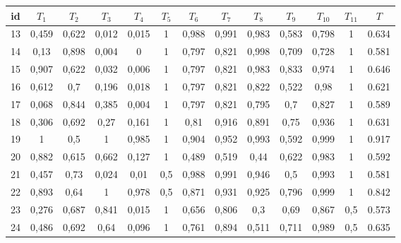 \documentclass{classrep}
\begin{document}
\begin{center}
  \begin{table}[H]
  \begin{adjustbox}{center=11cm}
    \begin{tabularx}{\textwidth}{ccccccccccccc}
    id & $T_1$ & $T_2$ & $T_3$ & $T_4$ & $T_5$ & $T_6$ & $T_7$ & $T_8$ & $T_9$ & $T_{10}$ & $T_{11}$ & $T$ \\ \hline 
   13 & 0,459 &  0,622 & 0,012 & 0,015 & 1 & 0,988 & 0,991 & 0,983 & 0,583 & 0,798 & 1 & 0.634 \\ \hline
   14 & 0,13 & 0,898 & 0,004 & 0 & 1 & 0,797 & 0,821 & 0,998 & 0,709 & 0,728 & 1 & 0.581 \\ \hline
   15 & 0,907& 0,622 & 0,032 & 0,006 & 1 & 0,797 & 0,821 & 0,983 & 0,833 & 0,974 & 1 & 0.646 \\ \hline
   16 & 0,612 & 0,7 & 0,196 & 0,018 & 1 & 0,797 & 0,821 & 0,822 & 0,522 & 0,98 & 1 & 0.621 \\ \hline
   17 &0,068 & 0,844 & 0,385 & 0,004 & 1 & 0,797 & 0,821 & 0,795 & 0,7 & 0,827 & 1 & 0.589 \\ \hline
   18 & 0,306 & 0,692 & 0,27 & 0,161 & 1 & 0,81 & 0,916 & 0,891 & 0,75 & 0,936 & 1 & 0.631 \\ \hline
   19 & 1 & 0,5 & 1 & 0,985 & 1 & 0,904 & 0,952 & 0,993 & 0,592 & 0,999 & 1 & 0.917 \\ \hline
   20 & 0,882 & 0,615 & 0,662 & 0,127 & 1 & 0,489 & 0,519 & 0,44 & 0,622 & 0,983 & 1 & 0.592 \\ \hline
   21 & 0,457 & 0,73 & 0,024 & 0,01 & 0,5 & 0,988 & 0,991 & 0,946 & 0,5 & 0,993 & 1 & 0.581 \\ \hline
   22 & 0,893 & 0,64 & 1 & 0,978 & 0,5 & 0,871 & 0,931 & 0,925 & 0,796 & 0,999 & 1 & 0.842 \\ \hline
   23 & 0,276 & 0,687 & 0,841 & 0,015 & 1 & 0,656 & 0,806 & 0,3 & 0,69 & 0,867 & 0,5 & 0.573 \\ \hline
   24 & 0,486 & 0,692 & 0,64 & 0,096 & 1 & 0,761 & 0,894 & 0,511 & 0,711 & 0,989 & 0,5 & 0.635 \\ \hline
  

\end{tabularx}
\end{adjustbox}
\end{table}
\end{center}
\end{document}
